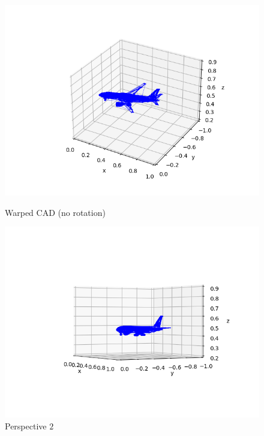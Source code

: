 \begin{figure}[H]
  \centering
  \begin{minipage}{.49\textwidth}
    \centering
    \includegraphics[width=\textwidth]{./figures/03-warped-cad-4.png}
    \caption*{Warped CAD (no rotation)}
  \end{minipage}
  \hfill
  \begin{minipage}{.49\textwidth}
    \centering
    \includegraphics[width=\textwidth]{./figures/03-warped-cad-2.png}
    \caption*{Perspective $2$}
  \end{minipage}
\end{figure}
